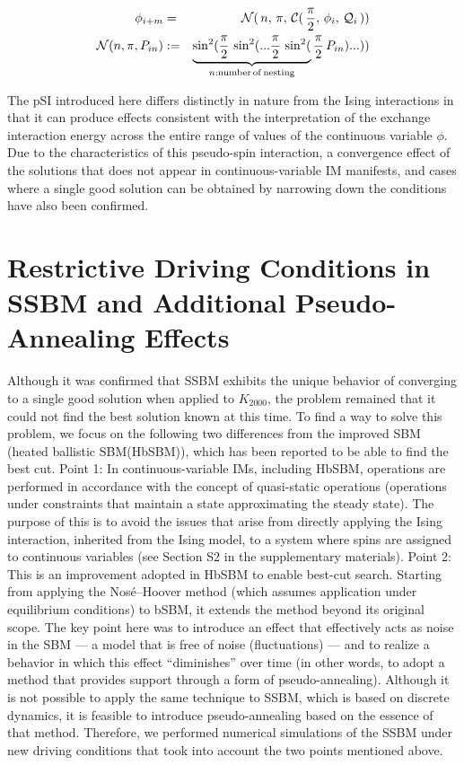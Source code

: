 \documentclass[%
 reprint,
 amsmath,amssymb,
 aps,
]{revtex4-2}
\begin{document}
\begin{widetext}
\begin{eqnarray}%
\phi_{i+m}
& = &
{\cal N}(\,n, \,\pi, \, {\cal C}( \,\frac{\pi}{2}, \,\phi_{i},  \,{\cal Q}_{i} \,))\\
{\cal N}(n, \pi, P_{in} )
& := &
\underbrace{
\sin^{2}(\frac{\pi}{2}\,\sin^{2}(... \frac{\pi}{2}\,\sin^{2}(}_{n:\rm{{ number\, of\, nesting}}}\frac{\pi}{2}\,P_{in} )...))
\end{eqnarray}
\end{widetext}

The pSI introduced here differs distinctly in nature from the Ising interactions in that it can produce effects consistent with the interpretation of the exchange interaction energy across the entire range of values of the continuous variable $\phi$. Due to the characteristics of this pseudo-spin interaction, a convergence effect of the solutions that does not appear in continuous-variable IM manifests, and cases where a single good solution can be obtained by narrowing down the conditions have also been confirmed\cite{Toshiy02}.



\section{Restrictive Driving Conditions in SSBM and Additional Pseudo-Annealing Effects}

Although it was confirmed that SSBM exhibits the unique behavior of converging to a single good solution when applied to $K_{2000}$, the problem remained that it could not find the best solution known at this time. To find a way to solve this problem, we focus on the following two differences from the improved SBM (heated ballistic SBM(HbSBM))\cite{GOTO-02}, which has been reported to be able to find the best cut. Point 1: In continuous-variable IMs, including HbSBM, operations are performed in accordance with the concept of quasi-static operations (operations under constraints that maintain a state approximating the steady state). The purpose of this is to avoid the issues that arise from directly applying the Ising interaction, inherited from the Ising model, to a system where spins are assigned to continuous variables (see Section S2 in the supplementary materials). Point 2: This is an improvement adopted in HbSBM to enable best-cut search. Starting from applying the Nosé–Hoover method (which assumes application under equilibrium conditions) to bSBM, it extends the method beyond its original scope. The key point here was to introduce an effect that effectively acts as noise in the SBM — a model that is free of noise (fluctuations) — and to realize a behavior in which this effect “diminishes” over time (in other words, to adopt a method that provides support through a form of pseudo-annealing). Although it is not possible to apply the same technique to SSBM, which is based on discrete dynamics, it is feasible to introduce pseudo-annealing based on the essence of that method.
Therefore, we performed numerical simulations of the SSBM under new driving conditions that took into account the two points mentioned above.
\end{document}

